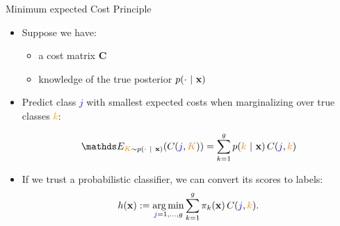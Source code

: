\documentclass[11pt,compress,t,notes=noshow, xcolor=table]{beamer}
\begin{document}
\begin{frame}{Minimum expected Cost Principle}


		\begin{itemize}
		
			\item Suppose we have:
            \begin{itemize}
                \item a cost matrix $\mathbf{C}$
                
                \item knowledge of the true posterior $p(\cdot ~|~ \mathbf{x})$
            \end{itemize}

                

			\item Predict class \textcolor{blue}{$j$} with smallest expected costs when marginalizing over true classes \textcolor{orange}{$k$}:

			$$ 	\E_{\textcolor{orange}{K} \sim p(\cdot ~|~ \xv)}( C(\textcolor{blue}{j},\textcolor{orange}{K}) ) = \sumkg p(\textcolor{orange}{k} ~|~ \xv) \, C(\textcolor{blue}{j},\textcolor{orange}{k})	$$
	
		\end{itemize}

    \begin{itemize}
        \item If we trust a probabilistic classifier, we can convert its scores to labels:
		$$  h(\mathbf{x}) := \mathop{\mathrm{arg\,min}}\limits_{\textcolor{blue}{j}=1,\ldots,g} \sum\limits_{k=1}^g 	\pi_{k}(\mathbf{x}) \, C(\textcolor{blue}{j},\textcolor{orange}{k}). $$
 

\end{itemize}
\end{frame}
\end{document}
